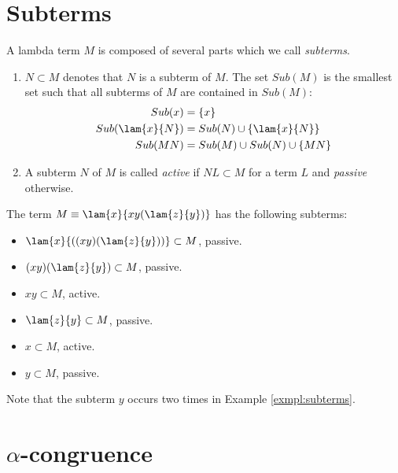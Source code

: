 \section{Subterms}

A lambda term $M$ is composed of several parts which we call \emph{subterms}.
\begin{definition}
	\begin{enumerate}
		\item $N\subset M$ denotes that $N$ is a subterm of $M$. The set $Sub(M)$ is the 
		smallest set such that all subterms of $M$ are contained in $Sub(M)$:
		\begin{align*}
			Sub(x) &=\{x\} \\
			Sub(\lam{x}{N}) &= Sub(N) \cup \{\lam{x}{N}\} \\
			Sub(M N) &= Sub(M) \cup Sub(N)  \cup \{M N\} %
		\end{align*}
		\item A subterm $N$ of $M$ is called \emph{active} if $N L \subset M$ 
		for a term $L$ and \emph{passive} otherwise.
	\end{enumerate}
\end{definition}
\begin{example}\label{exmpl:subterms}
	The term $M\equiv\lam{x}{xy(\lam{z}{y})}$ has the following subterms:
	\begin{itemize}
		\item $\lam{x}{((xy)(\lam{z}{y}))}\subset M$, passive.
		\item $(xy)(\lam{z}{y})\subset M$, passive.
		\item $xy\subset M$, active.
		\item $\lam{z}{y}\subset M$, passive.
		\item $x\subset M$, active.
		\item $y\subset M$, passive.
	\end{itemize}
\end{example}
Note that the subterm $y$ occurs two times in Example \ref{exmpl:subterms}.

\section{$\alpha$-congruence}

